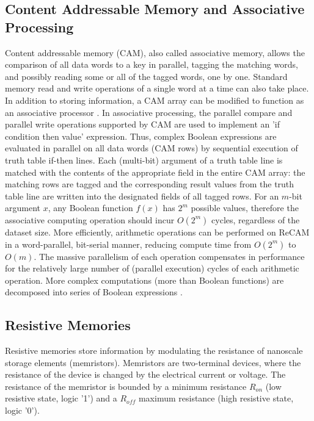 \documentclass{superfri}
\begin{document}
	\subsection{Content Addressable Memory and Associative Processing}
	\label{sec:CAMandAP}
	Content addressable memory (CAM), also called associative memory, allows the comparison of all data words to a key in parallel, tagging the matching words, and possibly reading some or all of the tagged words, one by one. Standard memory read and write operations of a single word at a time can also take place.
	In addition to storing information, a CAM array can be modified to function as an associative processor \cite{foster1976content}\cite{yavits2015resistive}. In associative processing, the parallel compare and parallel write operations supported by CAM are used to implement an 'if condition then value' expression. Thus, complex Boolean expressions are evaluated in parallel on all data words (CAM rows) by sequential execution of truth table if-then lines. Each (multi-bit) argument of a truth table line is matched with the contents of the appropriate field in the entire CAM array: the matching rows are tagged and the corresponding result values from the truth table line are written into the designated fields of all tagged rows. 
	For an $m$-bit argument $x$, any Boolean function $f(x)$ has $2^m$ possible values, therefore the associative computing operation should incur $O(2^m)$ cycles, regardless of the dataset size. More efficiently, arithmetic operations can be performed on ReCAM in a word-parallel, bit-serial manner, reducing compute time from $O(2^m)$ to $O(m)$. The massive parallelism of each operation compensates in performance for the relatively large number of (parallel execution) cycles of each arithmetic operation.
	More complex computations (more than Boolean functions) are decomposed into series of Boolean expressions \cite{foster1976content}\cite{yavits2015resistive}. 
	
	\subsection{Resistive Memories}
	\label{sec:resistive_memories}
	Resistive memories store information by modulating the resistance of nanoscale storage elements (memristors). Memristors are two-terminal devices, where the resistance of the device is changed by the electrical current or voltage. The resistance of the memristor is bounded by a minimum resistance $R_{on}$ (low resistive state, logic '1') and a $R_{off}$ maximum resistance (high resistive state, logic '0').
	
\end{document}

